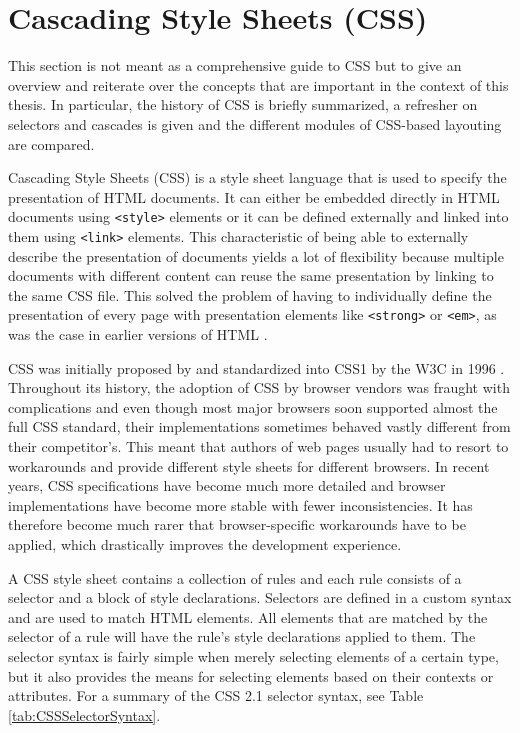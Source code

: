 \section{Cascading Style Sheets (CSS)}
\label{sec:CSS}

This section is not meant as a comprehensive guide to CSS but to give an overview and reiterate over the concepts that are important in the context of this thesis. In particular, the history of CSS is briefly summarized, a refresher on selectors and cascades is given and the different modules of CSS-based layouting are compared.

Cascading Style Sheets (CSS) is a style sheet language that is used to specify the presentation of HTML documents. It can either be embedded directly in HTML documents using \lstinline{<style>} elements or it can be defined externally and linked into them using \lstinline{<link>} elements. This characteristic of being able to externally describe the presentation of documents yields a lot of flexibility because multiple documents with different content can reuse the same presentation by linking to the same CSS file. This solved the problem of having to individually define the presentation of every page with presentation elements like \lstinline{<strong>} or \lstinline{<em>}, as was the case in earlier versions of HTML \parencite{HTML32}.

CSS was initially proposed by \cite{CSSProposal} and standardized into CSS1 by the W3C in 1996 \parencite{CSS1}. Throughout its history, the adoption of CSS by browser vendors was fraught with complications and even though most major browsers soon supported almost the full CSS standard, their implementations sometimes behaved vastly different from their competitor's. This meant that authors of web pages usually had to resort to workarounds and provide different style sheets for different browsers. In recent years, CSS specifications have become much more detailed \parencite{CSS21} and browser implementations have become more stable with fewer inconsistencies. It has therefore become much rarer that browser-specific workarounds have to be applied, which drastically improves the development experience.

A CSS style sheet contains a collection of rules and each rule consists of a selector and a block of style declarations. Selectors are defined in a custom syntax and are used to match HTML elements. All elements that are matched by the selector of a rule will have the rule's style declarations applied to them. The selector syntax is fairly simple when merely selecting elements of a certain type, but it also provides the means for selecting elements based on their contexts or attributes. For a summary of the CSS 2.1 selector syntax, see Table \ref{tab:CSSSelectorSyntax}.

